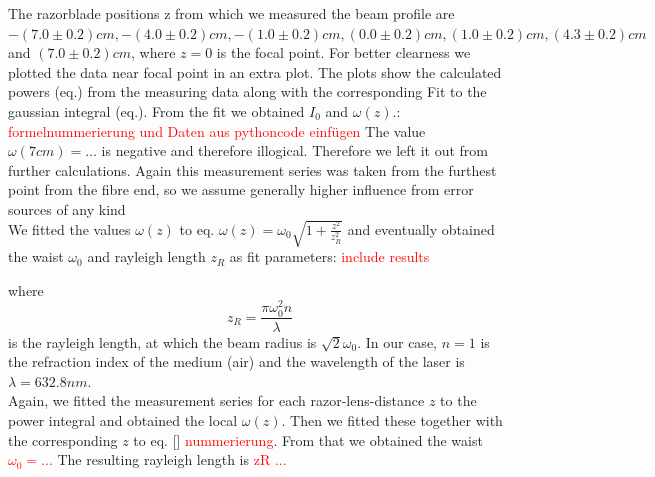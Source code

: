 \documentclass{article}
\begin{document}
The razorblade positions z from which we measured the beam profile are $-(7.0\pm 0.2)cm, -(4.0\pm 0.2)cm, -(1.0\pm 0.2)cm, (0.0\pm 0.2)cm, (1.0\pm 0.2)cm, (4.3\pm 0.2) cm$ and $(7.0\pm 0.2)cm$, where $z=0$ is the focal point. For better clearness we plotted the data near focal point in an extra plot. The plots show the calculated powers (eq.) from the measuring data along with the corresponding Fit to the gaussian integral (eq.). From the fit we obtained $I_{0}$ and $\omega(z)$.: \\ 

\textcolor{red}{formelnummerierung und Daten aus pythoncode einfügen}
The value $\omega(7cm) = ... $ is negative and therefore illogical. Therefore we left it out from further calculations. Again this measurement series was taken from the furthest point from the fibre end, so we assume generally higher influence from error sources of any kind\\

We fitted the values $\omega(z)$ to eq. $\omega (z) = \omega_{0}\sqrt{1+\frac{z^2}{z_{R}^2}}$ and eventually obtained the waist $\omega_{0}$ and rayleigh length $z_{R}$ as fit parameters: 
\textcolor{red}{include results} 

where 
\begin{equation}
z_{R} = \frac{\pi\omega_{0}^2 n}{\lambda} 
\end{equation}
 is the rayleigh length, at which the beam radius is $\sqrt{2}\omega_{0}$. In our case, $n=1$ is the refraction index of the medium (air) and the wavelength of the laser is $\lambda = 632.8 nm$.\\

Again, we fitted the measurement series for each razor-lens-distance $z$ to the power integral and obtained the local $\omega(z)$. Then we fitted these together with the corresponding $z$ to eq. []
\textcolor{red}{nummerierung}.
From that we obtained the waist 
\textcolor{red}{$\omega_{0} = ...$ }
The resulting rayleigh length is 
\textcolor{red}{zR ...}
\end{document}
